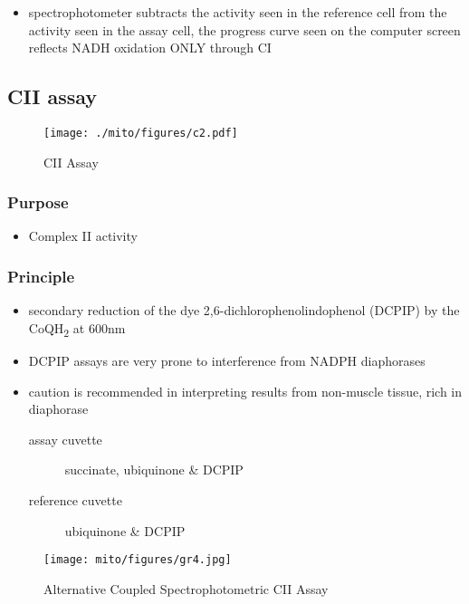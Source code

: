 \documentclass[12pt]{scrartcl}
\begin{document}

\begin{itemize}
\item spectrophotometer subtracts the activity seen in the reference cell
from the activity seen in the assay cell, the progress curve seen on
the computer screen reflects NADH oxidation ONLY through CI
\end{itemize}

\subsection{CII assay}
\label{sec:orgf70e16d}
\begin{figure}[htbp]
\centering
\texttt{[image: ./mito/figures/c2.pdf]}
\caption{\label{fig:orgffb5b82}CII Assay}
\end{figure}

\subsubsection{Purpose}
\label{sec:org53defd2}
\begin{itemize}
\item Complex II activity
\end{itemize}
\subsubsection{Principle}
\label{sec:orgd6df79d}
\begin{itemize}
\item secondary reduction of the dye 2,6-dichlorophenolindophenol (DCPIP)
by the CoQH\textsubscript{2} at 600nm
\item DCPIP assays are very prone to interference from NADPH
diaphorases
\item caution is recommended in interpreting results from non-muscle
tissue, rich in diaphorase
\begin{description}
\item[{assay cuvette}] succinate, ubiquinone \& DCPIP
\item[{reference cuvette}] ubiquinone \& DCPIP
\end{description}
\end{itemize}


\begin{figure}[htbp]
\centering
\texttt{[image: mito/figures/gr4.jpg]}
\caption{\label{fig:orgf69fd1f}Alternative Coupled Spectrophotometric CII Assay}
\end{figure}
\end{document}
